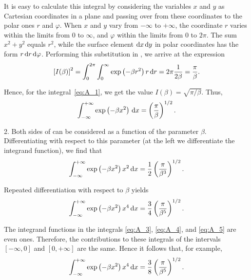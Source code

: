 It is easy to calculate this integral by considering the variables $x$ and $y$ as Cartesian coordinates in a plane and passing over from these coordinates to the polar ones $r$ and $\varphi$. When $x$ and $y$ vary from $-\infty$ to $+\infty$, the coordinate $r$ varies within the limits from $0$ to $\infty$, and $\varphi$ within the limits from $0$ to $2\pi$.
The sum $x^2+y^2$ equals $r^2$, while the surface element $\mathrm{d} x\,\mathrm{d} y$ in polar coordinates has the form $r\,\mathrm{d} r\,\mathrm{d}\varphi$. Performing this substitution in , we arrive at the expression
\begin{equation*}
    \left[I(\beta)\right]^2 = \int_0^{2\pi}\int_0^{\infty} \exp\left(-\beta r^2\right) r\,\mathrm{d} r = 2\pi \frac{1}{2\beta} = \frac{\pi}{\beta}.
\end{equation*}

\noindent
Hence, for the integral~\eqref{eq:A_1}, we get the value $I(\beta)=\sqrt{\pi/\beta}$. Thus,
\begin{equation}\label{eq:A_3}
    \int_{-\infty}^{+\infty} \exp\left(-\beta x^2\right)\,\mathrm{d} x = \left(\frac{\pi}{\beta}\right)^{1/2}.
\end{equation}

2. Both sides of  can be considered as a function of the parameter $\beta$. Differentiating with respect to this parameter (at the left we differentiate the integrand function), we find that
\begin{equation}\label{eq:A_4}
    \int_{-\infty}^{+\infty} \exp\left(-\beta x^2\right)x^2\,\mathrm{d} x = \frac{1}{2}\left(\frac{\pi}{\beta^3}\right)^{1/2}.
\end{equation}

\noindent
Repeated differentiation with respect to $\beta$ yields
\begin{equation}\label{eq:A_5}
    \int_{-\infty}^{+\infty} \exp\left(-\beta x^2\right)x^4\,\mathrm{d} x = \frac{3}{4}\left(\frac{\pi}{\beta^5}\right)^{1/2}.
\end{equation}

The integrand functions in the integrals \eqref{eq:A_3}, \eqref{eq:A_4}, and \eqref{eq:A_5} are even ones. Therefore, the contributions to these integrals of the intervals $[-\infty,0]$ and $[0,+\infty]$ are the same. Hence it follows that, for example,
\begin{equation}\label{eq:A_6}
    \int_{-\infty}^{+\infty} \exp\left(-\beta x^2\right)x^4\,\mathrm{d} x = \frac{3}{8}\left(\frac{\pi}{\beta^5}\right)^{1/2}.
\end{equation}

